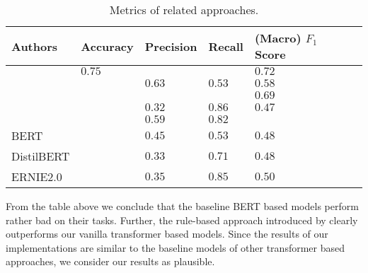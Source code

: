 \begin{table}[htpb]
    \centering
    \begin{tabular}{l | l l l l l}
        \toprule
         Authors & Accuracy& Precision & Recall & (Macro) $F_1$ Score  \\
        \midrule
        \Textcite{Xu:2019} & $0.75$ & & & $0.72$  \\
        \Textcite{Martino:2019} && $0.63$ & $0.53$ & $0.58$  \\
        \Textcite{Gao:2019} &&&& $0.69$  \\
        \Textcite{Lee:2019} && $0.32$ & $0.86$ & $0.47$  \\
        \midrule
        \Textcite{Femmer:2017} && $0.59$ &$0.82$ &  \\
        \midrule
        \ac{BERT} & & $0.45$ & $0.53$ & $0.48$ \\
        \ac{DistilBERT} & & $0.33$ & $0.71$ & $0.48$ \\
        \ac{ERNIE2.0} & & $0.35$ & $0.85$ & $0.50$\\
        \bottomrule
    \end{tabular}
    \caption[Metrics of Related Approaches]{Metrics of related approaches.}\label{tab:relation_to_existing_evidence:overview}
\end{table}

From the table above we conclude that the baseline \ac{BERT} based models perform rather bad on their tasks.
Further, the rule-based approach introduced by \textcite{Femmer:2017} clearly outperforms our vanilla transformer based models.
Since the results of our implementations are similar to the baseline models of other transformer based approaches, we consider our results as plausible.
